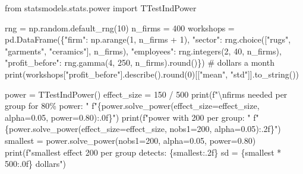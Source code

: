 \documentclass[
  letterpaper,
  10pt,
  twoside,
  openright,
  numbers=noenddot,
  chapterprefix=true]{scrbook}
\newenvironment{Shaded}{}{}
\newcommand{\BuiltInTok}[1]{\textcolor[rgb]{0.84,0.23,0.29}{#1}}
\newcommand{\CharTok}[1]{\textcolor[rgb]{0.01,0.18,0.38}{#1}}
\newcommand{\CommentTok}[1]{\textcolor[rgb]{0.42,0.45,0.49}{#1}}
\newcommand{\DecValTok}[1]{\textcolor[rgb]{0.00,0.36,0.77}{#1}}
\newcommand{\FloatTok}[1]{\textcolor[rgb]{0.00,0.36,0.77}{#1}}
\newcommand{\ImportTok}[1]{\textcolor[rgb]{0.01,0.18,0.38}{#1}}
\newcommand{\NormalTok}[1]{\textcolor[rgb]{0.14,0.16,0.18}{#1}}
\newcommand{\OperatorTok}[1]{\textcolor[rgb]{0.14,0.16,0.18}{#1}}
\newcommand{\SpecialCharTok}[1]{\textcolor[rgb]{0.00,0.36,0.77}{#1}}
\newcommand{\SpecialStringTok}[1]{\textcolor[rgb]{0.01,0.18,0.38}{#1}}
\newcommand{\StringTok}[1]{\textcolor[rgb]{0.01,0.18,0.38}{#1}}
\begin{document}
\label{check-trial-power}
\begin{Shaded}
\begin{Highlighting}[]
\ImportTok{from}\NormalTok{ statsmodels.stats.power }\ImportTok{import}\NormalTok{ TTestIndPower}

\NormalTok{rng }\OperatorTok{=}\NormalTok{ np.random.default\_rng(}\DecValTok{10}\NormalTok{)}
\NormalTok{n\_firms }\OperatorTok{=} \DecValTok{400}
\NormalTok{workshops }\OperatorTok{=}\NormalTok{ pd.DataFrame(\{}\StringTok{"firm"}\NormalTok{: np.arange(}\DecValTok{1}\NormalTok{, n\_firms }\OperatorTok{+} \DecValTok{1}\NormalTok{),}
                          \StringTok{"sector"}\NormalTok{: rng.choice([}\StringTok{"rugs"}\NormalTok{, }\StringTok{"garments"}\NormalTok{, }\StringTok{"ceramics"}\NormalTok{], n\_firms),}
                          \StringTok{"employees"}\NormalTok{: rng.integers(}\DecValTok{2}\NormalTok{, }\DecValTok{40}\NormalTok{, n\_firms),}
                          \StringTok{"profit\_before"}\NormalTok{: rng.gamma(}\DecValTok{4}\NormalTok{, }\DecValTok{250}\NormalTok{, n\_firms).}\BuiltInTok{round}\NormalTok{()\})   }\CommentTok{\# dollars a month}
\BuiltInTok{print}\NormalTok{(workshops[}\StringTok{"profit\_before"}\NormalTok{].describe().}\BuiltInTok{round}\NormalTok{(}\DecValTok{0}\NormalTok{)[[}\StringTok{"mean"}\NormalTok{, }\StringTok{"std"}\NormalTok{]].to\_string())}

\NormalTok{power }\OperatorTok{=}\NormalTok{ TTestIndPower()}
\NormalTok{effect\_size }\OperatorTok{=} \DecValTok{150} \OperatorTok{/} \DecValTok{500}
\BuiltInTok{print}\NormalTok{(}\SpecialStringTok{f"}\CharTok{\textbackslash{}n}\SpecialStringTok{firms needed per group for 80\% power:  "}
      \SpecialStringTok{f"}\SpecialCharTok{\{}\NormalTok{power}\SpecialCharTok{.}\NormalTok{solve\_power(effect\_size}\OperatorTok{=}\NormalTok{effect\_size, alpha}\OperatorTok{=}\FloatTok{0.05}\NormalTok{, power}\OperatorTok{=}\FloatTok{0.80}\NormalTok{)}\SpecialCharTok{:.0f\}}\SpecialStringTok{"}\NormalTok{)}
\BuiltInTok{print}\NormalTok{(}\SpecialStringTok{f"power with 200 per group:              "}
      \SpecialStringTok{f"}\SpecialCharTok{\{}\NormalTok{power}\SpecialCharTok{.}\NormalTok{solve\_power(effect\_size}\OperatorTok{=}\NormalTok{effect\_size, nobs1}\OperatorTok{=}\DecValTok{200}\NormalTok{, alpha}\OperatorTok{=}\FloatTok{0.05}\NormalTok{)}\SpecialCharTok{:.2f\}}\SpecialStringTok{"}\NormalTok{)}
\NormalTok{smallest }\OperatorTok{=}\NormalTok{ power.solve\_power(nobs1}\OperatorTok{=}\DecValTok{200}\NormalTok{, alpha}\OperatorTok{=}\FloatTok{0.05}\NormalTok{, power}\OperatorTok{=}\FloatTok{0.80}\NormalTok{)}
\BuiltInTok{print}\NormalTok{(}\SpecialStringTok{f"smallest effect 200 per group detects: }\SpecialCharTok{\{}\NormalTok{smallest}\SpecialCharTok{:.2f\}}\SpecialStringTok{ sd = }\SpecialCharTok{\{}\NormalTok{smallest }\OperatorTok{*} \DecValTok{500}\SpecialCharTok{:.0f\}}\SpecialStringTok{ dollars"}\NormalTok{)}
\end{Highlighting}
\end{Shaded}
\end{document}
